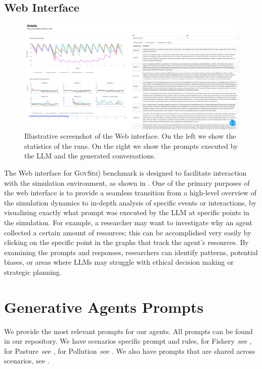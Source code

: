 \documentclass{article}
\newcommand{\envAbbr}{\textsc{GovSim}\xspace}
\newcommand{\fishScenarioFull}{Fishery\xspace}
\newcommand{\sheepScenarioFull}{Pasture\xspace}
\newcommand{\pollutionScenarioFull}{Pollution\xspace}
\begin{document}
\subsection{Web Interface}
%
%
\begin{figure}[t]
  \begin{center}
    \includegraphics[width=\linewidth]{fig/dashboard}
    \caption{Illustrative screenshot of the Web interface. On the left we show the statistics of the runs. On the right we show the prompts executed by the LLM and the generated conversations.}
    \label{fig:dashboard}
  \end{center}
\end{figure}

The Web interface for \envAbbr) benchmark is designed to facilitate interaction with the simulation environment, as shown in . One of the primary purposes of the web interface is to provide a seamless transition from a high-level overview of the simulation dynamics to in-depth analysis of specific events or interactions, by visualizing exactly what prompt was executed by the LLM at specific points in the simulation. For example, a researcher may want to investigate why an agent collected a certain amount of resources; this can be accomplished very easily by clicking on the specific point in the graphs that track the agent's resources. By examining the prompts and responses, researchers can identify patterns, potential biases, or areas where LLMs may struggle with ethical decision making or strategic planning.





%
\section{Generative Agents Prompts}
\label{app:generative_agents_prompts}
We provide the most relevant prompts for our agents. All prompts can be found in our repository. We have scenarios specific prompt and rules, for \fishScenarioFull~see , for \sheepScenarioFull~see , for \pollutionScenarioFull~see . We also have prompts that are shared across scenarios, see .
\end{document}
